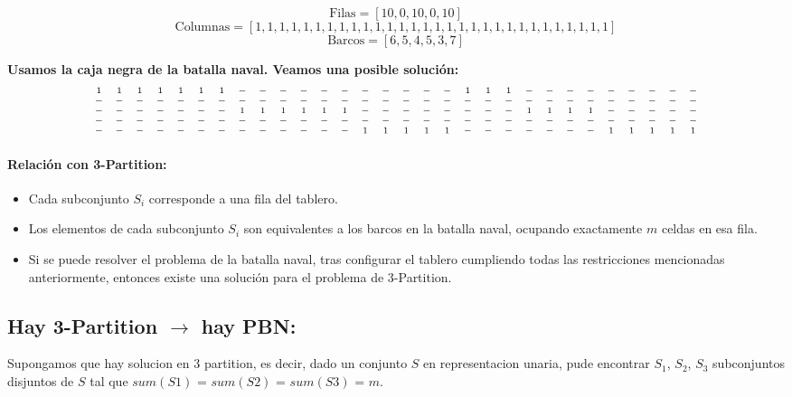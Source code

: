 \[
\text{Filas} = [10, 0, 10, 0, 10]
\]
\[
\text{Columnas} = [1, 1, 1, 1, 1, 1, 1, 1, 1, 1, 1, 1, 1, 1, 1, 1, 1, 1, 1, 1, 1, 1, 1, 1, 1, 1, 1, 1, 1, 1]
\]
\[
\text{Barcos} = [6, 5, 4, 5, 3, 7]
\]

\textbf{Usamos la caja negra de la batalla naval. Veamos una posible solución:}
\[
\scriptsize
\begin{array}{cccccccccccccccccccccccccccccc}
1 & 1 & 1 & 1 & 1 & 1 & 1 & - & - & - & - & - & - & - & - & - & - & - & 1 & 1 & 1 & - & - & - & - & - & - & - & - & - \\
- & - & - & - & - & - & - & - & - & - & - & - & - & - & - & - & - & - & - & - & - & - & - & - & - & - & - & - & - & - \\
- & - & - & - & - & - & - & 1 & 1 & 1 & 1 & 1 & 1 & - & - & - & - & - & - & - & - & 1 & 1 & 1 & 1 & - & - & - & - & - \\
- & - & - & - & - & - & - & - & - & - & - & - & - & - & - & - & - & - & - & - & - & - & - & - & - & - & - & - & - & - \\
- & - & - & - & - & - & - & - & - & - & - & - & - & 1 & 1 & 1 & 1 & 1 & - & - & - & - & - & - & - & 1 & 1 & 1 & 1 & 1 \\
\end{array}
\]

\paragraph{Relación con 3-Partition:}
\begin{itemize}
    \item Cada subconjunto \(S_i\) corresponde a una fila del tablero. 
    \item Los elementos de cada subconjunto \(S_i\) son equivalentes a los barcos en la batalla naval, ocupando exactamente \(m\) celdas en esa fila.
    \item Si se puede resolver el problema de la batalla naval, tras configurar el tablero cumpliendo todas las restricciones mencionadas anteriormente, entonces existe una solución para el problema de \(3\)-Partition.
\end{itemize}

\subsection{Hay 3-Partition $\rightarrow$ hay PBN:}

Supongamos que hay solucion en 3 partition, es decir, dado un conjunto $S$ en representacion unaria, pude
encontrar $S_1$, $S_2$, $S_3$ subconjuntos disjuntos de $S$ tal que $sum(S1)$ = $sum(S2)$ = $sum(S3)$ = $m$.

